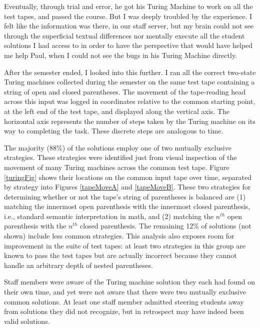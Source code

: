 Eventually, through trial and error, he got his Turing Machine to work on all the test tapes, and passed the course. But I was deeply troubled by the experience. I felt like the information was there, in our staff server, but my brain could not see through the superficial textual differences nor mentally execute all the student solutions I had access to in order to have the perspective that would have helped me help Paul, when I could not see the bugs in his Turing Machine directly.

After the semester ended, I looked into this further. I ran all the correct two-state Turing machines collected during the semester on the same test tape containing a string of open and closed parentheses. The movement of the tape-reading head across this input was logged in coordinates relative to the common starting point, at the left end of the test tape, and displayed along the vertical axis. The horizontal axis represents the number of steps taken by the Turing machine on its way to completing the task. These discrete steps are analogous to time. 

The majority (88\%) of the solutions employ one of two mutually exclusive strategies. These strategies were identified just from visual inspection of the movement of many Turing machines across the common test tape. Figure \ref{turingFig} shows their locations on the common input tape over time, separated by strategy into Figures \ref{tapeMoveA} and \ref{tapeMoveB}. These two strategies for determining whether or not the tape's string of parentheses is balanced are (1) matching the innermost open parenthesis with the innermost closed parenthesis, i.e., standard semantic interpretation in math, and (2) matching the $n^{th}$  open parenthesis with the $n^{th}$ closed parenthesis. The remaining 12\% of solutions (not shown) include less common strategies. This analysis also exposes room for improvement in the suite of test tapes: at least two strategies in this group are known to pass the test tapes but are actually incorrect because they cannot handle an arbitrary depth of nested parentheses. 

Staff members were aware of the Turing machine solution they each had found on their own time, and yet were not aware that there were two mutually exclusive common solutions. At least one staff member admitted steering students away from solutions they did not recognize, but in retrospect may have indeed been valid solutions. 

